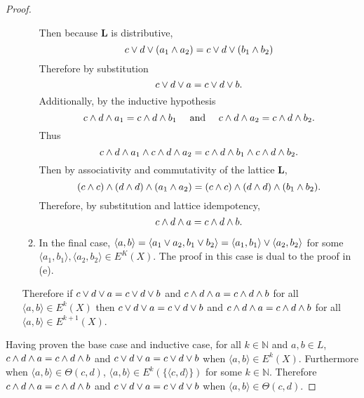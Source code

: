 \begin{proof}
\begin{enumerate}
\begin{enumerate}
\[        \]
        Then because $\mathbf{L}$ is distributive,
        \[
          c \vee d \vee (a_1 \wedge a_2) = c \vee d \vee (b_1 \wedge b_2)
        \]
        Therefore by substitution
        \[
          c \vee d \vee a = c \vee d \vee b.
        \]
        Additionally, by the inductive hypothesis
        \[
          c \wedge d \wedge a_1 = c \wedge d \wedge b_1 \quad\text{ and }\quad c\wedge d \wedge a_2 = c\wedge d \wedge b_2.
        \]
        Thus 
        \[
          c \wedge d \wedge a_1 \wedge c\wedge d \wedge a_2 = c \wedge d \wedge b_1 \wedge c\wedge d \wedge b_2.
        \]
        Then by associativity and commutativity of the lattice $\mathbf{L}$,
        \[
          (c \wedge c) \wedge (d\wedge d) \wedge (a_1 \wedge a_2) = (c \wedge c) \wedge (d\wedge d) \wedge (b_1 \wedge b_2).
        \]
        Therefore, by substitution and lattice idempotency,
        \[
          c \wedge d \wedge a = c \wedge d \wedge b.
        \]
      \item
        In the final case, $\langle a, b \rangle = \langle a_1 \vee a_2, b_1 \vee b_2 \rangle = \langle a_1, b_1 \rangle \vee \langle a_2, b_2\rangle$ for some $\langle a_1, b_1\rangle, \langle a_2, b_2\rangle \in E^K(X)$.
        The proof in this case is dual to the proof in (e). 
    \end{enumerate}
    Therefore if $c \vee d \vee a = c\vee d \vee b$ and $c \wedge d \wedge a = c\wedge d \wedge b$ for all $\langle a, b\rangle \in E^k(X)$ then $c \vee d \vee a = c\vee d \vee b$ and $c \wedge d \wedge a = c\wedge d \wedge b$ for all $\langle a, b\rangle \in E^{k+1}(X)$. 
  \end{enumerate}
  Having proven the base case and inductive case, for all $k \in \mathbb{N}$ and $a, b\in L$, $c\wedge d\wedge a = c\wedge d \wedge b$ and $c\vee d\vee a = c\vee d \vee b$ when $\langle a, b \rangle \in E^k(X)$.
  Furthermore when $\langle a, b\rangle \in \Theta(c, d)$, $\langle a, b\rangle \in E^k(\{\langle c, d\rangle\})$ for some $k\in\mathbb{N}$. 
  Therefore $c\wedge d\wedge a = c\wedge d \wedge b$ and $c\vee d\vee a = c\vee d \vee b$ when $\langle a, b \rangle \in \Theta(c, d)$. 
\end{proof}
